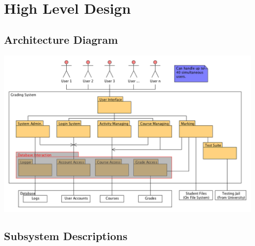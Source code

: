 \documentclass{article}
\begin{document}
\section{High Level Design}
\subsection{Architecture Diagram}
\centerline{\includegraphics[scale=0.5]{../images/architectureDiagram}}

\subsection{Subsystem Descriptions}
\end{document}
